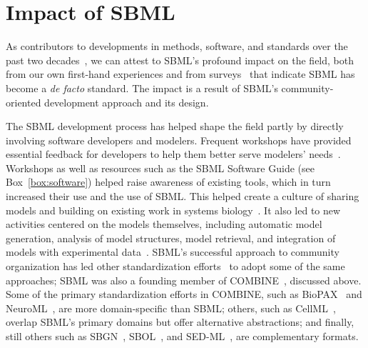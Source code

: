 \documentclass{sbml-paper}
\begin{document}





\section*{Impact of SBML}

As contributors to developments in methods, software, and standards over the past two decades~\citep{Hucka2015promotinga, Brazma2006standards}, we can attest to SBML's profound impact on the field, both from our own first-hand experiences and from surveys~\citep{Klipp2007systems} that indicate SBML has become a \emph{de facto} standard.  The impact is a result of SBML's community-oriented development approach and its design.

The SBML development process has helped shape the field partly by directly involving software developers and modelers.  Frequent workshops have provided essential feedback for developers to help them better serve modelers' needs~\citep[e.g.,][]{waltemath2014meeting}.  Workshops as well as resources such as the SBML Software Guide (see Box~\ref{box:software}) helped raise awareness of existing tools, which in turn increased their use and the use of SBML.  This helped create a culture of sharing models and building on existing work in systems biology~\citep{stanford2015evolution}.  It also led to new activities centered on the models themselves, including automatic model generation, analysis of model structures, model retrieval, and integration of models with experimental data~\citep{Draeger2014}.  SBML's successful approach to community organization has led other standardization efforts~\citep[e.g.,][]{Demir2010, Gleeson2010, Roehner2016, VanIersel2012} to adopt some of the same approaches; SBML was also a founding member of COMBINE~\citep{Hucka2015promotinga}, discussed above.  Some of the primary standardization efforts in COMBINE, such as BioPAX~\citep{Demir2010} and NeuroML~\citep{Gleeson2010}, are more domain-specific than SBML; others, such as CellML~\citep{Lloyd2004-fd}, overlap SBML's primary domains but offer alternative abstractions; and finally, still others such as SBGN~\citep{VanIersel2012}, SBOL~\citep{Roehner2016}, and SED-ML~\citep{waltemath2011reproducible}, are complementary formats.
\end{document}
